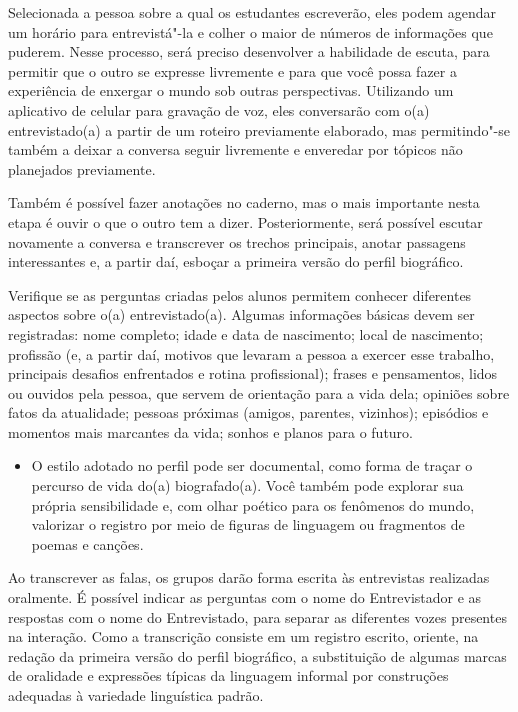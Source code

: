 \documentclass[12pt]{extarticle}
\begin{document}
Selecionada a pessoa sobre a qual os estudantes escreverão, eles podem
agendar um horário para entrevistá"-la e colher o maior de números de
informações que puderem. Nesse processo, será preciso desenvolver a
habilidade de escuta, para permitir que o outro se expresse livremente e
para que você possa fazer a experiência de enxergar o mundo sob outras
perspectivas. Utilizando um aplicativo de celular para gravação de voz,
eles conversarão com o(a) entrevistado(a) a partir de um roteiro
previamente elaborado, mas permitindo"-se também a deixar a conversa
seguir livremente e enveredar por tópicos não planejados previamente.

Também é possível fazer anotações no caderno, mas o mais importante
nesta etapa é ouvir o que o outro tem a dizer. Posteriormente, será
possível escutar novamente a conversa e transcrever os trechos
principais, anotar passagens interessantes e, a partir daí, esboçar a
primeira versão do perfil biográfico.

Verifique se as perguntas criadas pelos alunos permitem conhecer
diferentes aspectos sobre o(a) entrevistado(a). Algumas informações
básicas devem ser registradas: nome completo; idade e data de
nascimento; local de nascimento; profissão (e, a partir daí, motivos que
levaram a pessoa a exercer esse trabalho, principais desafios
enfrentados e rotina profissional); frases e pensamentos, lidos ou
ouvidos pela pessoa, que servem de orientação para a vida dela; opiniões
sobre fatos da atualidade; pessoas próximas (amigos, parentes,
vizinhos); episódios e momentos mais marcantes da vida; sonhos e planos
para o futuro.

\begin{itemize}
\item
  O estilo adotado no perfil pode ser documental, como forma de traçar o
  percurso de vida do(a) biografado(a). Você também pode explorar sua
  própria sensibilidade e, com olhar poético para os fenômenos do mundo,
  valorizar o registro por meio de figuras de linguagem ou fragmentos de
  poemas e canções.
\end{itemize}

Ao transcrever as falas, os grupos darão forma escrita às entrevistas
realizadas oralmente. É possível indicar as perguntas com o nome do
Entrevistador e as respostas com o nome do Entrevistado, para separar as
diferentes vozes presentes na interação. Como a transcrição consiste em
um registro escrito, oriente, na redação da primeira versão do perfil
biográfico, a substituição de algumas marcas de oralidade e expressões
típicas da linguagem informal por construções adequadas à variedade
linguística padrão.
\end{document}

